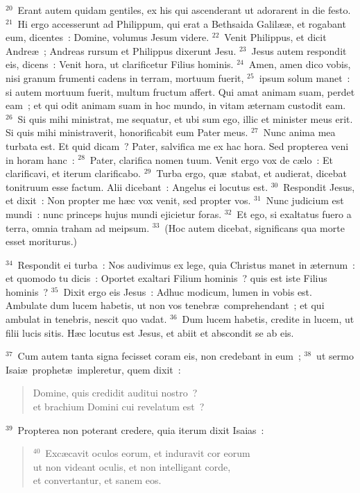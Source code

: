 ${}^{20}$~Erant autem quidam gentiles, ex his qui ascenderant ut adorarent in die festo.
${}^{21}$~Hi ergo accesserunt ad Philippum, qui erat a Bethsaida Galil\ae \ae , et rogabant eum, dicentes~: Domine, volumus Jesum videre.
${}^{22}$~Venit Philippus, et dicit Andre\ae~; Andreas rursum et Philippus dixerunt Jesu.
${}^{23}$~Jesus autem respondit eis, dicens~: Venit hora, ut clarificetur Filius hominis.
${}^{24}$~Amen, amen dico vobis, nisi granum frumenti cadens in terram, mortuum fuerit,
${}^{25}$~ipsum solum manet~: si autem mortuum fuerit, multum fructum affert. Qui amat animam suam, perdet eam~; et qui odit animam suam in hoc mundo, in vitam \ae ternam custodit eam.
${}^{26}$~Si quis mihi ministrat, me sequatur, et ubi sum ego, illic et minister meus erit. Si quis mihi ministraverit, honorificabit eum Pater meus.
${}^{27}$~Nunc anima mea turbata est. Et quid dicam~? Pater, salvifica me ex hac hora. Sed propterea veni in horam hanc~:
${}^{28}$~Pater, clarifica nomen tuum. Venit ergo vox de c\ae lo~: Et clarificavi, et iterum clarificabo.
${}^{29}$~Turba ergo, qu\ae\ stabat, et audierat, dicebat tonitruum esse factum. Alii dicebant~: Angelus ei locutus est.
${}^{30}$~Respondit Jesus, et dixit~: Non propter me h\ae c vox venit, sed propter vos.
${}^{31}$~Nunc judicium est mundi~: nunc princeps hujus mundi ejicietur foras.
${}^{32}$~Et ego, si exaltatus fuero a terra, omnia traham ad meipsum.
${}^{33}$~(Hoc autem dicebat, significans qua morte esset moriturus.)


${}^{34}$~Respondit ei turba~: Nos audivimus ex lege, quia Christus manet in \ae ternum~: et quomodo tu dicis~: Oportet exaltari Filium hominis~? quis est iste Filius hominis~?
${}^{35}$~Dixit ergo eis Jesus~: Adhuc modicum, lumen in vobis est. Ambulate dum lucem habetis, ut non vos tenebr\ae\ comprehendant~; et qui ambulat in tenebris, nescit quo vadat.
${}^{36}$~Dum lucem habetis, credite in lucem, ut filii lucis sitis. H\ae c locutus est Jesus, et abiit et abscondit se ab eis.


${}^{37}$~Cum autem tanta signa fecisset coram eis, non credebant in eum~;
${}^{38}$~ut sermo Isai\ae\ prophet\ae\ impleretur, quem dixit~: \begin{flushleft}\begin{verse}Domine, quis credidit auditui nostro~?\\ et brachium Domini cui revelatum est~?\end{verse}\end{flushleft}


${}^{39}$~Propterea non poterant credere, quia iterum dixit Isaias~:
\begin{flushleft}\begin{verse}${}^{40}$~Exc\ae cavit oculos eorum, et induravit cor eorum\\ ut non videant oculis, et non intelligant corde,\\ et convertantur, et sanem eos.\end{verse}\end{flushleft}


